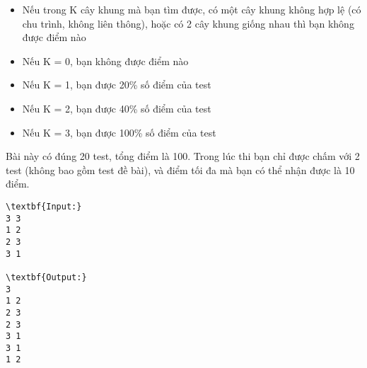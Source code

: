 \begin{itemize}
	\item Nếu trong K cây khung mà bạn tìm được, có một cây khung không hợp lệ (có chu trình, không liên thông), hoặc có 2 cây khung giống nhau thì bạn không được điểm nào
	\item Nếu K = 0, bạn không được điểm nào
	\item Nếu K = 1, bạn được 20\% số điểm của test
	\item Nếu K = 2, bạn được 40\% số điểm của test
	\item Nếu K = 3, bạn được 100\% số điểm của test
\end{itemize}

Bài này có đúng 20 test, tổng điểm là 100. Trong lúc thi bạn chỉ được chấm với 2 test (không bao gồm test đề bài), và điểm tối đa mà bạn có thể nhận được là 10 điểm.
\begin{verbatim}
\textbf{Input:}
3 3
1 2
2 3
3 1

\textbf{Output:}
3
1 2
2 3
2 3
3 1
3 1
1 2\end{verbatim}